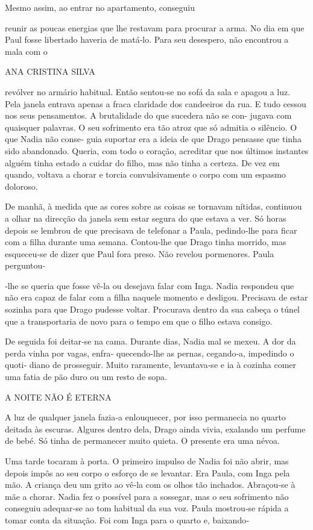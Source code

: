 Mesmo assim, ao entrar no apartamento, conseguiu

reunir as poucas energias que lhe restavam para procurar a arma. No dia
em que Paul fosse libertado haveria de matá‑lo. Para seu desespero, não
encontrou a mala com o

ANA CRISTINA SILVA

revólver no armário habitual. Então sentou‑se no sofá da sala e apagou a
luz. Pela janela entrava apenas a fraca claridade dos candeeiros da rua.
E tudo cessou nos seus pensamentos. A brutalidade do que sucedera não se
con‑ jugava com quaisquer palavras. O seu sofrimento era tão atroz que
só admitia o silêncio. O que Nadia não conse‑ guia suportar era a ideia
de que Drago pensasse que tinha sido abandonado. Queria, com todo o
coração, acreditar que nos últimos instantes alguém tinha estado a
cuidar do filho, mas não tinha a certeza. De vez em quando, voltava a
chorar e torcia convulsivamente o corpo com um espasmo doloroso.

De manhã, à medida que as cores sobre as coisas se tornavam nítidas,
continuou a olhar na direcção da janela sem estar segura do que estava a
ver. Só horas depois se lembrou de que precisava de telefonar a Paula,
pedindo‑lhe para ficar com a filha durante uma semana. Contou‑lhe que
Drago tinha morrido, mas esqueceu‑se de dizer que Paul fora preso. Não
revelou pormenores. Paula perguntou‑

‑lhe se queria que fosse vê‑la ou desejava falar com Inga. Nadia
respondeu que não era capaz de falar com a filha naquele momento e
desligou. Precisava de estar sozinha para que Drago pudesse voltar.
Procurava dentro da sua cabeça o túnel que a transportaria de novo para
o tempo em que o filho estava consigo.

De seguida foi deitar‑se na cama. Durante dias, Nadia mal se mexeu. A
dor da perda vinha por vagas, enfra‑ quecendo‑lhe as pernas, cegando‑a,
impedindo o quoti‑ diano de prosseguir. Muito raramente, levantava‑se e
ia à cozinha comer uma fatia de pão duro ou um resto de sopa.

A NOITE NÃO É ETERNA

A luz de qualquer janela fazia‑a enlouquecer, por isso permanecia no
quarto deitada às escuras. Algures dentro dela, Drago ainda vivia,
exalando um perfume de bebé. Só tinha de permanecer muito quieta. O
presente era uma névoa.

Uma tarde tocaram à porta. O primeiro impulso de Nadia foi não abrir,
mas depois impôs ao seu corpo o esforço de se levantar. Era Paula, com
Inga pela mão. A criança deu um grito ao vê‑la com os olhos tão
inchados. Abraçou‑se à mãe a chorar. Nadia fez o possível para a
sossegar, mas o seu sofrimento não conseguiu adequar‑se ao tom habitual
da sua voz. Paula mostrou‑se rápida a tomar conta da situação. Foi com
Inga para o quarto e, baixando‑

